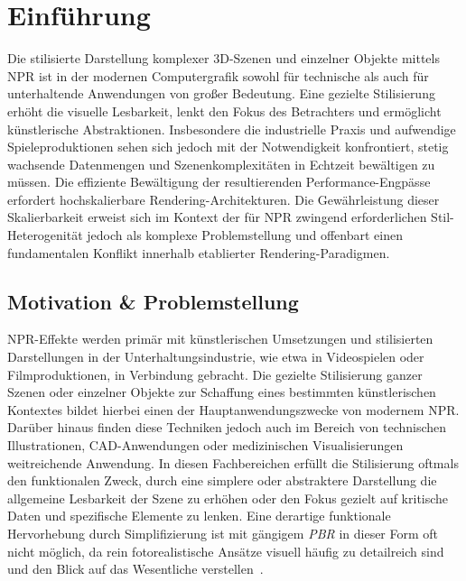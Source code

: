 \chapter{Einführung}
\label{ch:01_introduction}

Die stilisierte Darstellung komplexer 3D-Szenen und einzelner Objekte mittels \ac{NPR} ist in der modernen Computergrafik sowohl für technische als auch für unterhaltende Anwendungen von großer
Bedeutung.
Eine gezielte Stilisierung erhöht die visuelle Lesbarkeit, lenkt den Fokus des Betrachters und ermöglicht künstlerische
Abstraktionen.
Insbesondere die industrielle Praxis und aufwendige Spieleproduktionen sehen sich jedoch mit der Notwendigkeit
konfrontiert, stetig wachsende Datenmengen und Szenenkomplexitäten in Echtzeit bewältigen zu müssen.
Die effiziente Bewältigung der resultierenden Performance-Engpässe erfordert hochskalierbare Rendering-Architekturen.
Die Gewährleistung dieser Skalierbarkeit erweist sich im Kontext der für \ac{NPR} zwingend erforderlichen Stil-Heterogenität
jedoch als komplexe Problemstellung und offenbart einen fundamentalen Konflikt innerhalb etablierter
Rendering-Paradigmen. \cite[Abschn.~1]{magdicsPostprocessingNPREffects2013}


\section{Motivation \& Problemstellung}
\label{sec:0101_motivation_and_problem}

\ac{NPR}-Effekte werden primär mit künstlerischen Umsetzungen und stilisierten Darstellungen in der
Unterhaltungsindustrie, wie etwa in Videospielen oder Filmproduktionen, in Verbindung gebracht.
Die gezielte Stilisierung ganzer Szenen oder einzelner Objekte zur Schaffung eines bestimmten künstlerischen Kontextes
bildet hierbei einen der Hauptanwendungszwecke von modernem \ac{NPR}.
Darüber hinaus finden diese Techniken jedoch auch im Bereich von technischen Illustrationen, \ac{CAD}-Anwendungen oder
medizinischen Visualisierungen weitreichende Anwendung.
In diesen Fachbereichen erfüllt die Stilisierung oftmals den funktionalen Zweck, durch eine simplere oder abstraktere
Darstellung die allgemeine Lesbarkeit der Szene zu erhöhen oder den Fokus gezielt auf kritische Daten und spezifische
Elemente zu lenken.
Eine derartige funktionale Hervorhebung durch Simplifizierung ist mit gängigem \textit{\ac{PBR}} in dieser Form oft
nicht möglich, da rein fotorealistische Ansätze visuell häufig zu detailreich sind und den Blick auf das Wesentliche
verstellen~\cite[Abschn.~1]{magdicsPostprocessingNPREffects2013}.

